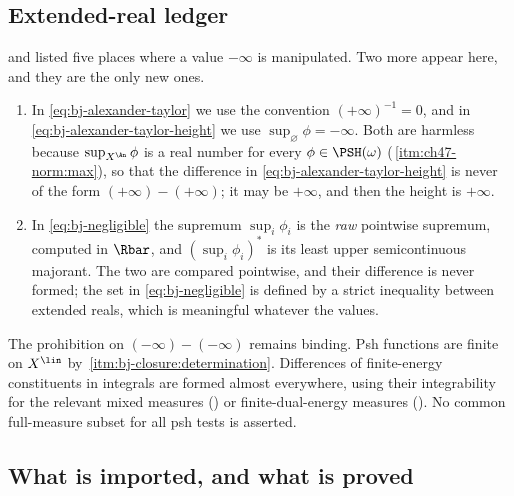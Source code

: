 \subsection{Extended-real ledger}
\label{sec:ch48-ledger}

 and  listed five places where
a value $-\infty$ is manipulated.  Two more appear here, and they are the
only new ones.

\begin{enumerate}
\item\label{itm:ch48-ledger:cap}
      In \eqref{eq:bj-alexander-taylor} we use the convention
      $(+\infty)^{-1}=0$, and in \eqref{eq:bj-alexander-taylor-height} we
      use $\sup_\varnothing\phi=-\infty$.  Both are harmless because
      $\sup_{X^{\An}}\phi$ is a real number for every
      $\phi\in\PSH(\omega)$
      (\,\cref{itm:ch47-norm:max}), so
      that the difference in \eqref{eq:bj-alexander-taylor-height} is never
      of the form $(+\infty)-(+\infty)$; it may be $+\infty$, and then
      the height is $+\infty$.
\item\label{itm:ch48-ledger:sup}
      In \eqref{eq:bj-negligible} the supremum $\sup_i\phi_i$ is the
      \emph{raw} pointwise supremum, computed in $\Rbar$, and
      $(\sup_i\phi_i)^*$ is its least upper semicontinuous majorant.
      The two are compared pointwise, and their difference is never formed;
      the set in \eqref{eq:bj-negligible} is defined by a strict
      inequality between extended reals, which is meaningful whatever the
      values.
\end{enumerate}

The prohibition on $(-\infty)-(-\infty)$ remains binding. Psh functions
are finite on $X^{\lin}$ by
\,\cref{itm:bj-closure:determination}.
Differences of finite-energy constituents in integrals are formed almost
everywhere, using their integrability for the relevant mixed measures
() or finite-dual-energy measures
(). No common full-measure subset for all psh
tests is asserted.

\subsection{What is imported, and what is proved}
\label{sec:ch48-imported}

